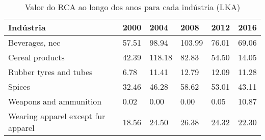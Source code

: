 \begin{table}
\centering
\caption{Valor do RCA ao longo dos anos para cada indústria (LKA)}
\label{tab:ex3-tempo-LKA}
\begin{tabular}{p{6cm}p{1.5cm}p{1.5cm}p{1.5cm}p{1.5cm}p{1.5cm}}
\toprule
                         Indústria &  2000 &   2004 &   2008 &  2012 &  2016 \\
\midrule
                    Beverages, nec & 57.51 &  98.94 & 103.99 & 76.01 & 69.06 \\
                   Cereal products & 42.39 & 118.18 &  82.83 & 54.50 & 14.05 \\
            Rubber tyres and tubes &  6.78 &  11.41 &  12.79 & 12.09 & 11.28 \\
                            Spices & 32.46 &  46.28 &  58.62 & 53.01 & 43.11 \\
            Weapons and ammunition &  0.02 &   0.00 &   0.00 &  0.05 & 10.87 \\
Wearing apparel except fur apparel & 18.56 &  24.50 &  26.38 & 24.32 & 22.30 \\
\bottomrule
\end{tabular}
\end{table}
